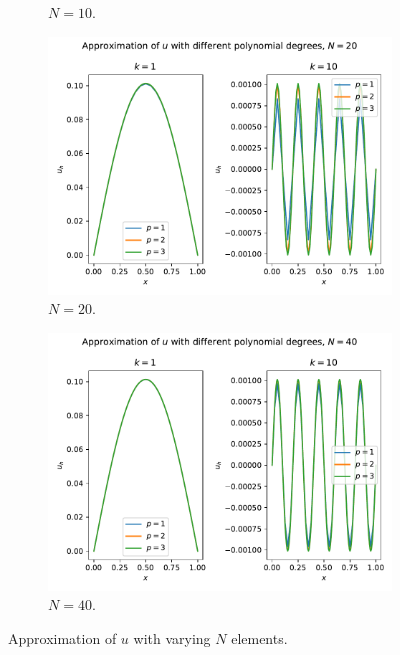 \begin{solution}
\begin{figure}
\begin{subfigure}[b]{0.45\textwidth}
            \caption{$N=10$.\label{fig:ex4_2}}
        \end{subfigure}
        \begin{subfigure}[b]{0.45\textwidth}
            \includegraphics[width=\textwidth]{1_elliptic/exercise_1_4_N=20.pdf}
            \caption{$N=20$.\label{fig:ex4_3}}
        \end{subfigure}
        \hfill
        \begin{subfigure}[b]{0.45\textwidth}
            \includegraphics[width=\textwidth]{1_elliptic/exercise_1_4_N=40.pdf}
            \caption{$N=40$.\label{fig:ex4_4}}
        \end{subfigure}
        \caption{Approximation of $u$ with varying $N$ elements.\label{fig:ex4}}
    \end{figure}
\end{solution}